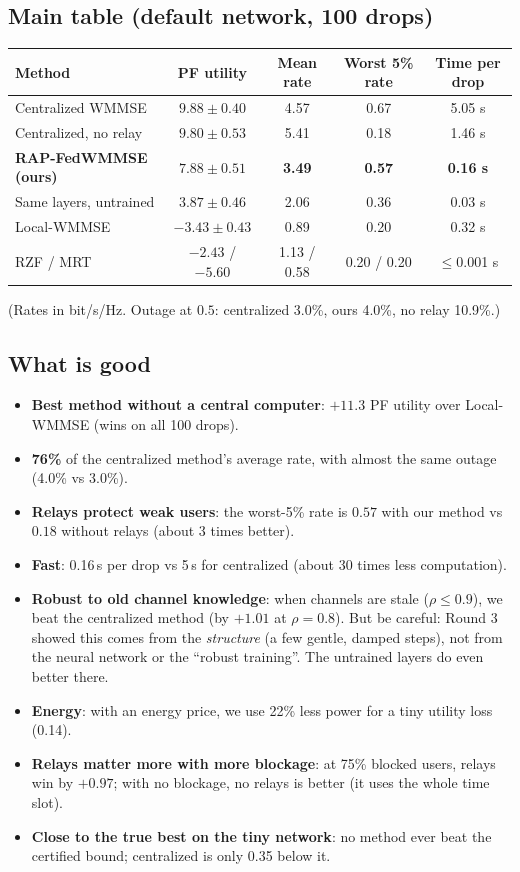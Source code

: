 \documentclass[11pt,a4paper]{article}
\begin{document}
\subsection*{Main table (default network, 100 drops)}
\begin{center}
\small
\begin{tabular}{lcccc}
\toprule
Method & PF utility & Mean rate & Worst 5\% rate & Time per drop \\
\midrule
Centralized WMMSE & $9.88 \pm 0.40$ & 4.57 & 0.67 & 5.05 s \\
Centralized, no relay & $9.80 \pm 0.53$ & 5.41 & 0.18 & 1.46 s \\
\textbf{RAP-FedWMMSE (ours)} & $\mathbf{7.88 \pm 0.51}$ & \textbf{3.49} & \textbf{0.57} & \textbf{0.16 s} \\
Same layers, untrained & $3.87 \pm 0.46$ & 2.06 & 0.36 & 0.03 s \\
Local-WMMSE & $-3.43 \pm 0.43$ & 0.89 & 0.20 & 0.32 s \\
RZF / MRT & $-2.43$ / $-5.60$ & 1.13 / 0.58 & 0.20 / 0.20 & $\le$0.001 s \\
\bottomrule
\end{tabular}
\end{center}
(Rates in bit/s/Hz. Outage at $0.5$: centralized 3.0\%, ours 4.0\%, no relay 10.9\%.)

\subsection*{What is good}
\begin{itemize}
\item \textbf{Best method without a central computer}: $+11.3$ PF utility over Local-WMMSE (wins on all 100 drops).
\item \textbf{76\%} of the centralized method's average rate, with almost the same outage (4.0\% vs 3.0\%).
\item \textbf{Relays protect weak users}: the worst-5\% rate is $0.57$ with our method vs $0.18$ without relays
  (about 3 times better).
\item \textbf{Fast}: 0.16\,s per drop vs 5\,s for centralized (about 30 times less computation).
\item \textbf{Robust to old channel knowledge}: when channels are stale ($\rho \le 0.9$), we beat the centralized
  method (by $+1.01$ at $\rho = 0.8$). But be careful: Round 3 showed this comes from the \emph{structure} (a few
  gentle, damped steps), not from the neural network or the ``robust training''. The untrained layers do even
  better there.
\item \textbf{Energy}: with an energy price, we use 22\% less power for a tiny utility loss (0.14).
\item \textbf{Relays matter more with more blockage}: at 75\% blocked users, relays win by $+0.97$; with no
  blockage, no relays is better (it uses the whole time slot).
\item \textbf{Close to the true best on the tiny network}: no method ever beat the certified bound; centralized is
  only 0.35 below it.
\end{itemize}
\end{document}
